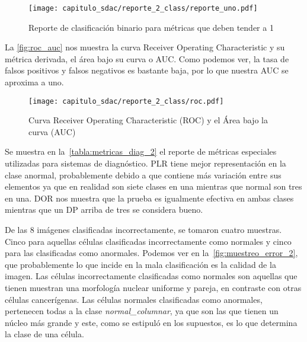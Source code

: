 \begin{figure}[H]
    \centering
    \texttt{[image: capitulo\_sdac/reporte\_2\_class/reporte\_uno.pdf]}
    \caption{Reporte de clasificación binario para métricas que deben tender a 1}\label{fig:reporte_2_1}
\end{figure}

La \autoref{fig:roc_auc} nos muestra la curva Receiver Operating Characteristic y su
métrica derivada, el área bajo su curva o AUC. Como podemos ver, la tasa de
falsos positivos y falsos negativos es bastante baja, por lo que nuestra AUC se
aproxima a uno.

\begin{figure}[H]
    \centering
    \texttt{[image: capitulo\_sdac/reporte\_2\_class/roc.pdf]}
    \caption{Curva Receiver Operating Characteristic (ROC) y el Área bajo la curva (AUC)}\label{fig:roc_auc}
\end{figure}

Se muestra en la~\autoref{tabla:metricas_diag_2} el reporte de métricas
especiales utilizadas para sistemas de diagnóstico. PLR tiene mejor
representación en la clase anormal, probablemente debido a que contiene más
variación entre sus elementos ya que en realidad son siete clases en una
mientras que normal son tres en una. DOR nos muestra que la prueba es igualmente
efectiva en ambas clases mientras que un DP arriba de tres se considera bueno.

\begin{table}[H]
    \centering
    \caption{Métricas para diagnóstico binario}
    \label{tabla:metricas_diag_2}
    \end{table}

De las 8 imágenes clasificadas incorrectamente, se tomaron cuatro muestras.
Cinco para aquellas células clasificadas incorrectamente como normales y cinco
para las clasificadas como anormales. Podemos ver en
la~\autoref{fig:muestreo_error_2}, que probablemente lo que incide en la mala
clasificación es la calidad de la imagen. Las células incorrectamente
clasificadas como normales son aquellas que tienen muestran una morfología
nuclear uniforme y pareja, en contraste con otras células cancerígenas. Las
células normales clasificadas como anormales, pertenecen todas a la clase
\emph{normal\_columnar}, ya que son las que tienen un núcleo más grande y este,
como se estipuló en los supuestos, es lo que determina la clase de una célula.

